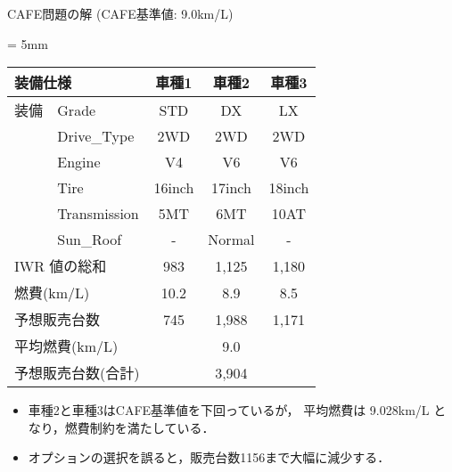 \documentclass[dvipdfmx, 11pt]{beamer}
\begin{document}
\begin{frame}{CAFE問題の解 {\normalsize (CAFE基準値: 9.0km/L)}}
 \begin{exampleblock}{}
  \centering
  \tabcolsep = 5mm
  \begin{tabular}{l|l|c|c|c} 
    \multicolumn{2}{l|}{装備仕様}  & 車種1 & 車種2 & 車種3 \\\hline
    装備 & \textsf{Grade}  & \textsf{STD}    & \textsf{DX}     & \textsf{LX}\\
    &\textsf{Drive\_Type}  & \textsf{2WD}    & \textsf{2WD}    & \textsf{2WD}\\
    &\textsf{Engine}	   & \textsf{V4}     & \textsf{V6}     & \textsf{V6}\\
    &\textsf{Tire}	   & \textsf{16inch} & \textsf{17inch} & \textsf{18inch}\\
    &\textsf{Transmission} & \textsf{5MT}    & \textsf{6MT}    & \textsf{10AT}\\
    &\textsf{Sun\_Roof}    & -               & \textsf{Normal} & -  \\ \hline
    \multicolumn{2}{l|}{IWR 値の総和} & 983  & 1,125   & 1,180 \\ %
    \multicolumn{2}{l|}{燃費(km/L)}      & 10.2  & 8.9     & 8.5 \\ %
    \multicolumn{2}{l|}{予想販売台数}    & 745   & 1,988   & 1,171  \\ \hline
    \multicolumn{2}{l|}{平均燃費(km/L)}  & \multicolumn{3}{c}{9.0} \\ 
    \multicolumn{2}{l|}{予想販売台数(合計)}  & \multicolumn{3}{c}{3,904} \\ 
  \end{tabular}
 \end{exampleblock}
 \vfill
 \begin{itemize}
 \item 車種2と車種3はCAFE基準値を下回っているが，
   平均燃費は 9.028km/L となり，燃費制約を満たしている．
 \item オプションの選択を誤ると，販売台数1156まで大幅に減少する．
 \end{itemize}
\end{frame}
\end{document}
